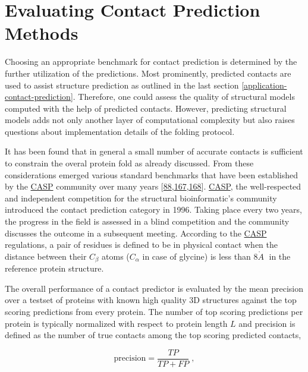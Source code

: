 \documentclass[11pt,a4paper,twoside]{book}
\newcommand{\Cb}{C_\beta}
\newcommand{\angstrom}{\mathring{A} \;}
\theoremstyle{definition}
\theoremstyle{definition}
\theoremstyle{remark}
\begin{document}
\section{Evaluating Contact Prediction
Methods}\label{intro-cp-evaluation}

Choosing an appropriate benchmark for contact prediction is determined
by the further utilization of the predictions. Most prominently,
predicted contacts are used to assist structure prediction as outlined
in the last section \ref{application-contact-prediction}. Therefore, one
could assess the quality of structural models computed with the help of
predicted contacts. However, predicting structural models adds not only
another layer of computational complexity but also raises questions
about implementation details of the folding protocol.

It has been found that in general a small number of accurate contacts is
sufficient to constrain the overal protein fold as already discussed.
From these considerations emerged various standard benchmarks that have
been established by the \protect\hyperlink{abbrev}{CASP} community over
many years
{[}\protect\hyperlink{ref-Monastyrskyy2015}{88},\protect\hyperlink{ref-Monastyrskyy2011}{167},\protect\hyperlink{ref-Monastyrskyy2014a}{168}{]}.
\protect\hyperlink{abbrev}{CASP}, the well-respected and independent
competition for the structural bioinformatic's community introduced the
contact prediction category in 1996. Taking place every two years, the
progress in the field is assessed in a blind competition and the
community discusses the outcome in a subsequent meeting. According to
the \protect\hyperlink{abbrev}{CASP} regulations, a pair of residues is
defined to be in physical contact when the distance between their
\(\Cb\) atoms (\(C_{\alpha}\) in case of glycine) is less than
\(8 \angstrom\) in the reference protein structure.

The overall performance of a contact predictor is evaluated by the mean
precision over a testset of proteins with known high quality 3D
structures against the top scoring predictions from every protein. The
number of top scoring predictions per protein is typically normalized
with respect to protein length \(L\) and precision is defined as the
number of true contacts among the top scoring predicted contacts,

\begin{equation}
    \textrm{precision}  = \frac{TP}{TP + FP} \; ,
\end{equation}
\end{document}
